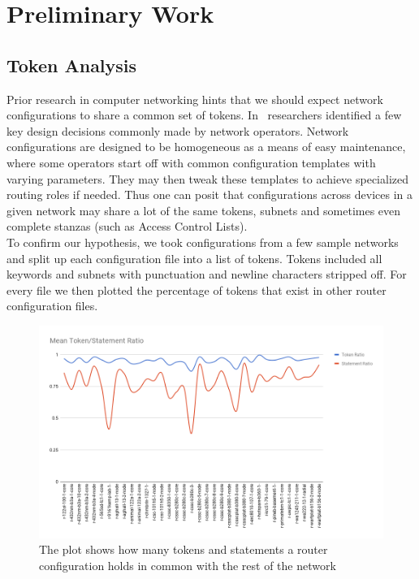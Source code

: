 \section{Preliminary Work}

\subsection{Token Analysis}
Prior research in computer networking hints that we should expect network configurations to share a common set of tokens. In~\cite{complexity} researchers identified a few key design decisions commonly made by network operators. Network configurations are designed to be homogeneous as a means of easy maintenance, where some operators start off with common configuration templates with varying parameters. They may then tweak these templates to achieve specialized routing roles if needed. Thus one can posit that configurations across devices in a given network may share a lot of the same tokens, subnets and sometimes even complete stanzas (such as Access Control Lists).\\ 

To confirm our hypothesis, we took configurations from a few sample networks and split up each configuration file into a list of tokens. Tokens included all keywords and subnets with punctuation and newline characters stripped off. For every file we then plotted the percentage of tokens that exist in other router configuration files.

\begin{figure}[H]
	\centering
	\includegraphics[width=5in]{chart.png}
	\caption{The plot shows how many tokens and statements a router configuration holds in common with the rest of the network}
\end{figure}

